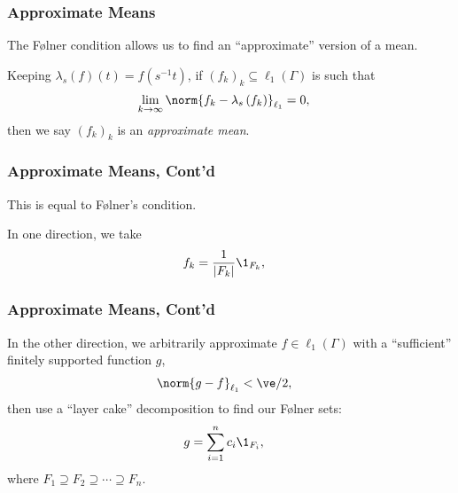 \documentclass{beamer-custom}
\begin{document}
\begin{frame}
  \frametitle{Approximate Means}
  The Følner condition allows us to find an ``approximate'' version of a mean.\pause\newline

  Keeping $\lambda_s(f)(t) = f\left( s^{-1}t \right)$, if $\left( f_k \right)_k\subseteq \ell_1\left( \Gamma \right)$ is such that
  \begin{align*}
    \lim_{k\rightarrow\infty}\norm{f_k - \lambda_s\left( f_k \right)}_{\ell_1} &= 0,
  \end{align*}
  then we say $\left( f_k \right)_k$ is an \textit{approximate mean}.
  \end{frame}
  \begin{frame}
  \frametitle{Approximate Means, Cont'd}
  This is equal to Følner's condition.\newline

  In one direction, we take
  \begin{align*}
    f_k &= \frac{1}{\left\vert F_k \right\vert}\1_{F_k},
  \end{align*}
\end{frame}
\begin{frame}
  \frametitle{Approximate Means, Cont'd}
  In the other direction, we arbitrarily approximate $f\in\ell_1\left( \Gamma \right)$ with a ``sufficient'' finitely supported function $g$,
  \begin{align*}
    \norm{g - f}_{\ell_1} &< \ve/2,
  \end{align*}
  then use a ``layer cake'' decomposition to find our Følner sets:
  \begin{align*}
    g &= \sum_{i=1}^{n}c_i\1_{F_i},
  \end{align*}
  where $F_1\supseteq F_2\supseteq \cdots \supseteq F_n$.
\end{frame}
\end{document}
